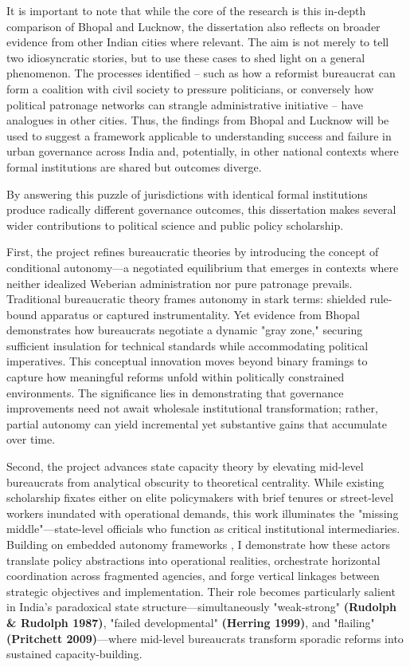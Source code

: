 It is important to note that while the core of the research is this in-depth comparison of Bhopal and Lucknow, the dissertation also reflects on broader evidence from other Indian cities where relevant. The aim is not merely to tell two idiosyncratic stories, but to use these cases to shed light on a general phenomenon. The processes identified – such as how a reformist bureaucrat can form a coalition with civil society to pressure politicians, or conversely how political patronage networks can strangle administrative initiative – have analogues in other cities. Thus, the findings from Bhopal and Lucknow will be used to suggest a framework applicable to understanding success and failure in urban governance across India and, potentially, in other national contexts where formal institutions are shared but outcomes diverge.

By answering this puzzle of jurisdictions with identical formal institutions produce radically different governance outcomes, this dissertation makes several wider contributions to political science and public policy scholarship.

First, the project refines bureaucratic theories by introducing the concept of conditional autonomy—a negotiated equilibrium that emerges in contexts where neither idealized Weberian administration nor pure patronage prevails. Traditional bureaucratic theory frames autonomy in stark terms: shielded rule-bound apparatus or captured instrumentality. Yet evidence from Bhopal demonstrates how bureaucrats negotiate a dynamic "gray zone," securing sufficient insulation for technical standards while accommodating political imperatives. This conceptual innovation moves beyond binary framings to capture how meaningful reforms unfold within politically constrained environments. The significance lies in demonstrating that governance improvements need not await wholesale institutional transformation; rather, partial autonomy can yield incremental yet substantive gains that accumulate over time.

Second, the project advances state capacity theory by elevating mid-level bureaucrats from analytical obscurity to theoretical centrality. While existing scholarship fixates either on elite policymakers with brief tenures or street-level workers inundated with operational demands, this work illuminates the "missing middle"—state-level officials who function as critical institutional intermediaries. Building on embedded autonomy frameworks \citep{evans_bureaucracy_1999}\citep{migdal_strong_1988}\citep{tsai_accountability_2012}, I demonstrate how these actors translate policy abstractions into operational realities, orchestrate horizontal coordination across fragmented agencies, and forge vertical linkages between strategic objectives and implementation. Their role becomes particularly salient in India's paradoxical state structure—simultaneously "weak-strong" \textbf{(Rudolph & Rudolph 1987)}, "failed developmental" \textbf{(Herring 1999)}, and "flailing" \textbf{(Pritchett 2009)}—where mid-level bureaucrats transform sporadic reforms into sustained capacity-building.

